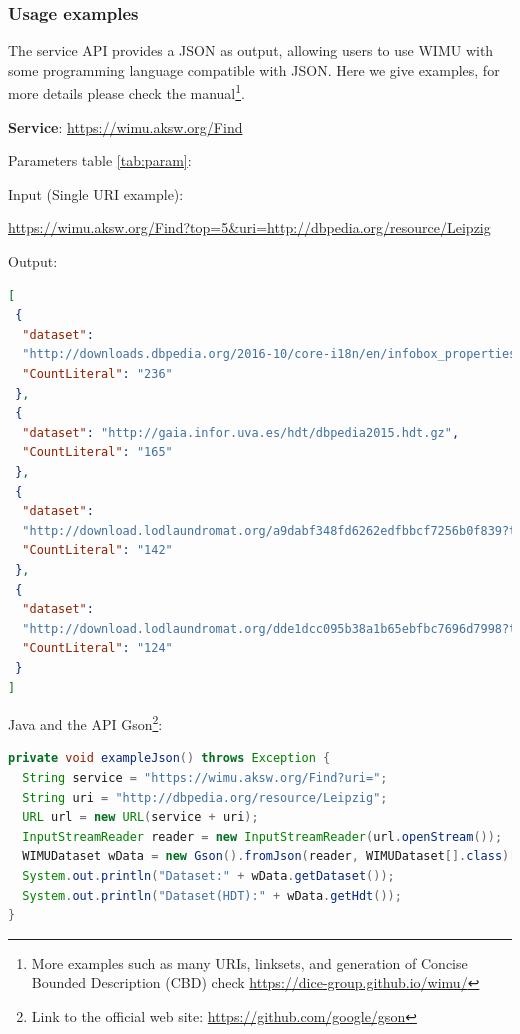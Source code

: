 \subsubsection{Usage examples}
The service API provides a JSON as output, allowing users to use WIMU with some programming language compatible with JSON.
Here we give examples, for more details please check the manual\footnote{More examples such as many URIs, linksets, and generation of Concise Bounded Description (CBD) check \url{https://dice-group.github.io/wimu/}}.

\textbf{Service}: \url{https://wimu.aksw.org/Find}

Parameters table \ref{tab:param}:
\begin{table}[]
\centering
\caption{Parameters}
\label{tab:param}
\end{table}

Input (Single URI example): 

\url{https://wimu.aksw.org/Find?top=5&uri=http://dbpedia.org/resource/Leipzig}

Output:
\begin{lstlisting}[language=JSON]
[
 {
  "dataset": 
  "http://downloads.dbpedia.org/2016-10/core-i18n/en/infobox_properties_en.ttl.bz2",
  "CountLiteral": "236"
 },
 {
  "dataset": "http://gaia.infor.uva.es/hdt/dbpedia2015.hdt.gz",
  "CountLiteral": "165"
 },
 {
  "dataset": 
  "http://download.lodlaundromat.org/a9dabf348fd6262edfbbcf7256b0f839?type=hdt",
  "CountLiteral": "142"
 },
 {
  "dataset": 
  "http://download.lodlaundromat.org/dde1dcc095b38a1b65ebfbc7696d7998?type=hdt",
  "CountLiteral": "124"
 }
]
\end{lstlisting}

Java and the API Gson\footnote{Link to the official web site: \url{https://github.com/google/gson}}:
\begin{lstlisting}[language=JAVA]
private void exampleJson() throws Exception {
  String service = "https://wimu.aksw.org/Find?uri=";
  String uri = "http://dbpedia.org/resource/Leipzig";
  URL url = new URL(service + uri);
  InputStreamReader reader = new InputStreamReader(url.openStream());
  WIMUDataset wData = new Gson().fromJson(reader, WIMUDataset[].class)[0];
  System.out.println("Dataset:" + wData.getDataset());
  System.out.println("Dataset(HDT):" + wData.getHdt());
}
\end{lstlisting}


